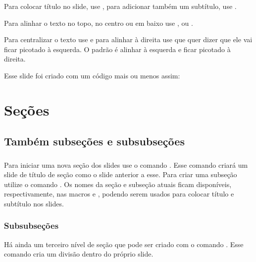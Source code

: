 \documentclass[aspectratio=169]{beamer}
\begin{document}
\begin{frame}[t,fragile]\frametitle{\secname}\framesubtitle{\subsecname}
  Para colocar título no slide, use , para adicionar também um subtítulo, use .

  Para alinhar o texto no topo, no centro ou em baixo use \inline*{[t]}, \inline*{[c]} ou \inline*{[b]}.

  Para centralizar o texto use  e para alinhar à direita use  que quer dizer que ele vai ficar picotado à esquerda.
  O padrão é alinhar à esquerda e ficar picotado à direita.

  Esse slide foi criado com um código mais ou menos assim:

\section{Seções}

\subsection{Também subseções e subsubseções}
\begin{frame}[t]\frametitle{\secname}\framesubtitle{\subsecname}
  Para iniciar uma nova seção dos slides use o comando .
  Esse comando criará um slide de título de seção como o slide anterior a esse.
  Para criar uma subseção utilize o comando .
  Os nomes da seção e subseção atuais ficam disponíveis, respectivamente, nas macros  e , podendo serem usados para colocar título e subtítulo nos slides.

  \subsubsection{Subsubseções}

  Há ainda um terceiro nível de seção que pode ser criado com o comando . Esse comando cria um divisão dentro do próprio slide.
\end{frame}
\end{document}
